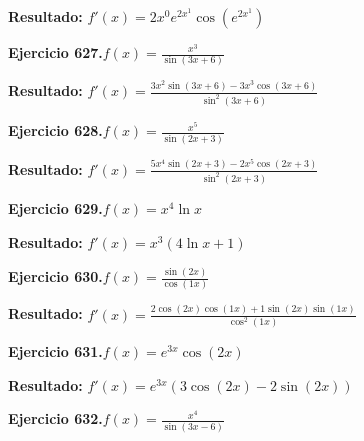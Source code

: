 \documentclass[10pt,a4paper]{article}
\begin{document}
\begin{solbox}
\textbf{Resultado:} \(\displaystyle f'(x) = 2x^{0}e^{2x^{1}}\cos(e^{2x^{1}})\)
\end{solbox}

\begin{ejbox}
\textbf{Ejercicio 627.}\quad $f(x) = \frac{x^{3}}{\sin(3x +6)}$
\end{ejbox}

\begin{solbox}
\textbf{Resultado:} \(\displaystyle f'(x) = \frac{3x^{2}\sin(3x +6) - 3x^{3}\cos(3x +6)}{\sin^2(3x +6)}\)
\end{solbox}

\newpage
\begin{ejbox}
\textbf{Ejercicio 628.}\quad $f(x) = \frac{x^{5}}{\sin(2x +3)}$
\end{ejbox}

\begin{solbox}
\textbf{Resultado:} \(\displaystyle f'(x) = \frac{5x^{4}\sin(2x +3) - 2x^{5}\cos(2x +3)}{\sin^2(2x +3)}\)
\end{solbox}

\begin{ejbox}
\textbf{Ejercicio 629.}\quad $f(x) = x^{4} \ln x$
\end{ejbox}

\begin{solbox}
\textbf{Resultado:} \(\displaystyle f'(x) = x^{3}(4\ln x + 1)\)
\end{solbox}

\begin{ejbox}
\textbf{Ejercicio 630.}\quad $f(x) = \frac{\sin(2x)}{\cos(1x)}$
\end{ejbox}

\begin{solbox}
\textbf{Resultado:} \(\displaystyle f'(x) = \frac{2\cos(2x)\cos(1x) + 1\sin(2x)\sin(1x)}{\cos^2(1x)}\)
\end{solbox}

\newpage
\begin{ejbox}
\textbf{Ejercicio 631.}\quad $f(x) = e^{3x} \cos(2x)$
\end{ejbox}

\begin{solbox}
\textbf{Resultado:} \(\displaystyle f'(x) = e^{3x}(3\cos(2x) - 2\sin(2x))\)
\end{solbox}

\begin{ejbox}
\textbf{Ejercicio 632.}\quad $f(x) = \frac{x^{4}}{\sin(3x -6)}$
\end{ejbox}
\end{document}

